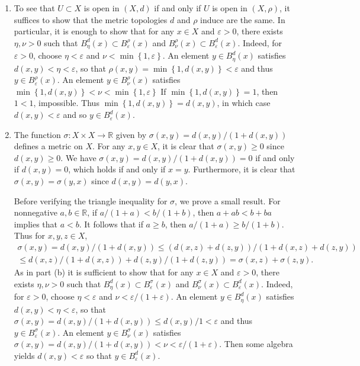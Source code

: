 \documentclass[11pt,leqno]{article}
\theoremstyle{plain}
\theoremstyle{definition}
\numberwithin{equation}{section}
\numberwithin{lem}{section}
\newcommand{\cbr}[1]{\left\{#1\right\}}
\begin{document}
\begin{enumerate}
\begin{enumerate}
    \item To see that $U\subset X$ is open in $(X,d)$ if and only if $U$ is open in $(X,\rho)$, it suffices to show that the metric topologies $d$ and $\rho$ induce are the same. In particular, it is enough to show that for any $x\in X$ and $\varepsilon>0$, there exists $\eta, \nu>0$ such that $B_\eta^d(x)\subset B_\varepsilon^\rho(x)$ and $B_\nu^\rho(x)\subset B_\varepsilon^d(x)$. Indeed, for $\varepsilon>0$, choose $\eta < \varepsilon$ and $\nu< \min\cbr{1,\varepsilon}$. An element $y\in B_\eta^d(x)$ satisfies $d(x,y)<\eta<\varepsilon$, so that $\rho(x,y) = \min\cbr{1,d(x,y)} < \varepsilon$ and thus $y\in B_\varepsilon^\rho(x)$. An element $y\in B_\nu^\rho(x)$ satisfies $\min\cbr{1,d(x,y)}<\nu<\min\cbr{1,\varepsilon}$ If $\min\cbr{1,d(x,y)} = 1$, then $1<1$, impossible. Thus $\min\cbr{1,d(x,y)} = d(x,y)$, in which case $d(x,y)<\varepsilon$ and so $y\in B_\varepsilon^d(x)$.
    
    \item The function $\sigma\colon X\times X\to \mathbb R$ given by $\sigma(x,y) = d(x,y)/(1+d(x,y))$ defines a metric on $X$. For any $x,y\in X$, it is clear that $\sigma(x,y) \geq 0$ since $d(x,y)\geq 0$. We have $\sigma(x,y) = d(x,y)/(1+d(x,y)) = 0$ if and only if $d(x,y) = 0$, which holds if and only if $x=y$. Furthermore, it is clear that $\sigma(x,y) = \sigma(y,x)$ since $d(x,y) = d(y,x)$.
    
    Before verifying the triangle inequality for $\sigma$, we prove a small result. For nonnegative $a,b\in \mathbb R$, if $a/(1+a)< b/(1+b)$, then $a+ ab < b + ba$ implies that $a<b$. It follows that if $a\geq b$, then $a/(1+a)\geq b/(1+b)$. Thus for $x,y,z\in X$, \begin{multline*}
      \sigma(x,y) = d(x,y)/(1+d(x,y)) \leq (d(x,z) + d(z,y))/(1+ d(x,z) + d(z,y))\\ \leq d(x,z)/(1+ d(x,z)) + d(z,y)/(1+d(z,y)) = \sigma(x,z) + \sigma(z,y).
    \end{multline*}
    As in part (b) it is sufficient to show that for any $x\in X$ and $\varepsilon>0$, there exists $\eta, \nu>0$ such that $B_\eta^d(x)\subset B_\varepsilon^\sigma(x)$ and $B_\nu^\sigma(x)\subset B_\varepsilon^d(x)$. Indeed, for $\varepsilon>0$, choose $\eta< \varepsilon$ and $\nu <\varepsilon/(1+\varepsilon)$. An element $y\in B_\eta^d(x)$ satisfies $d(x,y)<\eta<\varepsilon$, so that $\sigma(x,y) = d(x,y)/(1+d(x,y))\leq d(x,y)/1 < \varepsilon$ and thus $y\in B_\varepsilon^\sigma(x)$. An element $y\in B_\nu^\sigma(x)$ satisfies $\sigma(x,y) = d(x,y)/(1+d(x,y))<\nu< \varepsilon/(1+\varepsilon)$. Then some algebra yields $d(x,y)<\varepsilon$ so that $y\in B_\varepsilon^d(x)$.
  \end{enumerate}
  

\end{enumerate}
\end{document}
